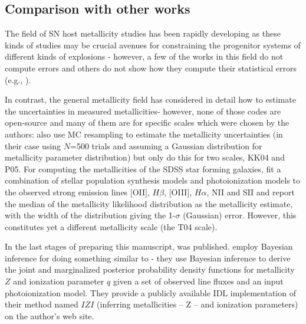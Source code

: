 \documentclass{emulateapj}
\begin{document}
\subsection{Comparison with other works}



The field of SN host metallicity studies has been rapidly developing as these kinds of studies may be crucial avenues for constraining the progenitor systems of different kinds of explosions - however, a few of the works in this field do not compute errors and others do not show how they compute their statistical errors  (e.g., \citealt{anderson10,leloudas11,sanders12,leloudas14}). %

In contrast, the general metallicity field has considered in detail how to estimate the uncertainties in measured metallicities- however, none of those codes are open-source and many of them are for specific scales which were chosen by the authors:  \citet{moustakas10} also use MC resampling to estimate the metallicity uncertainties (in their case using $N$=500 trials and assuming a Gaussian distribution for metallicity parameter distribution) but only do this for two scales, KK04 and P05. For computing the metallicities of the SDSS star forming galaxies, \citet{tremonti04} fit a combination of stellar population synthesis models and  photoionization models to the observed strong emission lines [OII], $H\beta$, [OIII], $H\alpha$, NII and SII and report the median of the metallicity likelihood distribution as the metallicity estimate, with the width of the distribution giving the 1-$\sigma$ (Gaussian) error. However, this constitutes yet a different metallicity scale (the T04 scale).

In the last stages of preparing this manuscript, \citet{blanc15} was published.  \citet{blanc15} employ Bayesian inference for doing something similar to \citet{tremonti04} - they use Bayesian inference to derive the joint and marginalized posterior probability density functions for metallicity $Z$ and ionization parameter $q$ given a set of observed line fluxes and an input photoionization model. They provide a publicly available IDL implementation of their method named $IZI$ (inferring metallicities -- Z -- and ionization parameters) on the author's web site.
\end{document}
